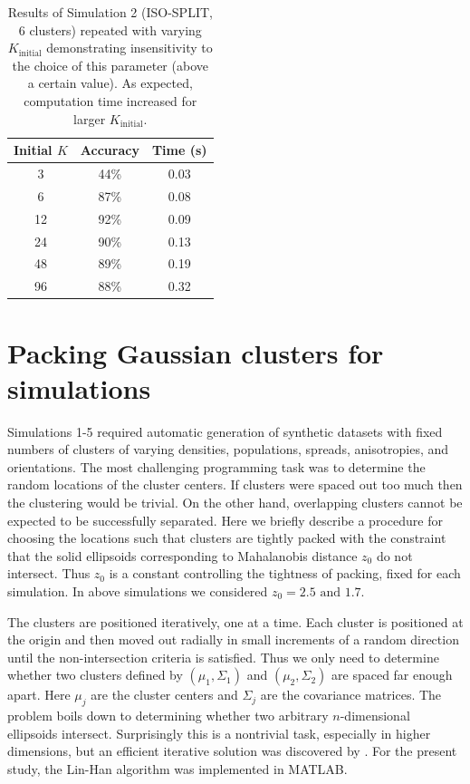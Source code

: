 \documentclass[10pt]{article}
\begin{document}
\begin{table}[t]
  \centering
\begin{tabular}{c|c|c|}
	\textbf{Initial $K$} & \textbf{Accuracy} & \textbf{Time (s)} \\
	\hline
	3 & 44\% & 0.03 \\
6 & 87\% & 0.08 \\
12 & 92\% & 0.09 \\
24 & 90\% & 0.13 \\
48 & 89\% & 0.19 \\
96 & 88\% & 0.32 \\
\end{tabular}
\caption{
\label{table:initial_K_dependence}
Results of Simulation 2 (ISO-SPLIT, 6 clusters) repeated with varying $K_\text{initial}$ demonstrating insensitivity to the choice of this parameter (above a certain value). As expected, computation time increased for larger $K_\text{initial}$.
}
\end{table}

\section {Packing Gaussian clusters for simulations}
\label{appendixPacking}

Simulations 1-5 required automatic generation of synthetic datasets with fixed numbers of clusters of varying densities, populations, spreads, anisotropies, and orientations. The most challenging programming task was to determine the random locations of the cluster centers. If clusters were spaced out too much then the clustering would be trivial. On the other hand, overlapping clusters cannot be expected to be successfully separated. Here we briefly describe a procedure for choosing the locations such that clusters are tightly packed with the constraint that the solid ellipsoids corresponding to Mahalanobis distance $z_0$ do not intersect. Thus $z_0$ is a constant controlling the tightness of packing, fixed for each simulation. In above simulations we considered $z_0=2.5\text{ and }1.7$.

The clusters are positioned iteratively, one at a time. Each cluster is positioned at the origin and then moved out radially in small increments of a random direction until the non-intersection criteria is satisfied. Thus we only need to determine whether two clusters defined by $(\mu_1,\Sigma_1)$ and $(\mu_2,\Sigma_2)$ are spaced far enough apart. Here $\mu_j$ are the cluster centers and $\Sigma_j$ are the covariance matrices. The problem boils down to determining whether two arbitrary $n$-dimensional ellipsoids intersect. Surprisingly this is a nontrivial task, especially in higher dimensions, but an efficient iterative solution was discovered by \cite{ellipsoid-distance}. For the present study, the Lin-Han algorithm was implemented in MATLAB.



\end{document}
